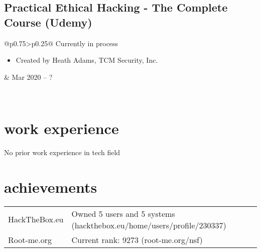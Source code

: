\documentclass[a4paper]{article}
\makeatletter
\newlength{\tablewidth}
\newenvironment{period}[2]{%
\newcommand{\sarma}{#2}%
\setlength{\tablewidth}{\linewidth}
\addtolength{\tablewidth}{-2\tabcolsep}
\begin{tabular}{@{}p{0.75\tablewidth}>{\raggedleft\arraybackslash}p{0.25\tablewidth}@{}}%
#1 \newline
\begin{itemize}
}{%
\end{itemize} & \sarma \\%
\end{tabular}\\
}
\newenvironment{skills}{%
\setlength{\tablewidth}{\linewidth}
\addtolength{\tablewidth}{-2\tabcolsep}
\begin{tabular}{@{}p{0.15\tablewidth}p{0.85\tablewidth}@{}}
}{%
\end{tabular}
}
\makeatother
\begin{document}
\subsection{Practical Ethical Hacking - The Complete Course (Udemy)}
\begin{period}{Currently in process}{Mar 2020 -- ?}
\item Created by Heath Adams, TCM Security, Inc.
\end{period}

\section{work experience}
No prior work experience in tech field\\
\iffalse

\subsection{Firma d.o.o., Zagreb, Croatia}
\begin{period}{Software Engineering Intern}{Jun 2012 -- Sep 2012}
    \item 
        worked on improving a copyright infringement detection system
        \begin{itemize}
            \item Java, Git, Linux
            \item awarded for having best test code coverage out of all (10) interns
        \end{itemize}
\end{period}
\subsection{University of Zagreb, Faculty of Electrical Engineering and Computing, Croatia}
\begin{period}{Teaching assistant}{Oct 2008 -- May 2009}
    \item Digital Logic
    \item Algorithms and Data Structures
\end{period}
\begin{period}{Team leader}{Sep 2011 -- Jan 2012}
    \item managed a team of 10 students in \textit{Software Design} class project
\end{period}
\fi



\section{achievements}
\begin{skills}
    HackTheBox.eu   &   Owned 5 users and 5 systems (hackthebox.eu/home/users/profile/230337)\\
    Root-me.org     &   Current rank: 9273 (root-me.org/nsf)\\
    
\end{skills}
\end{document}
